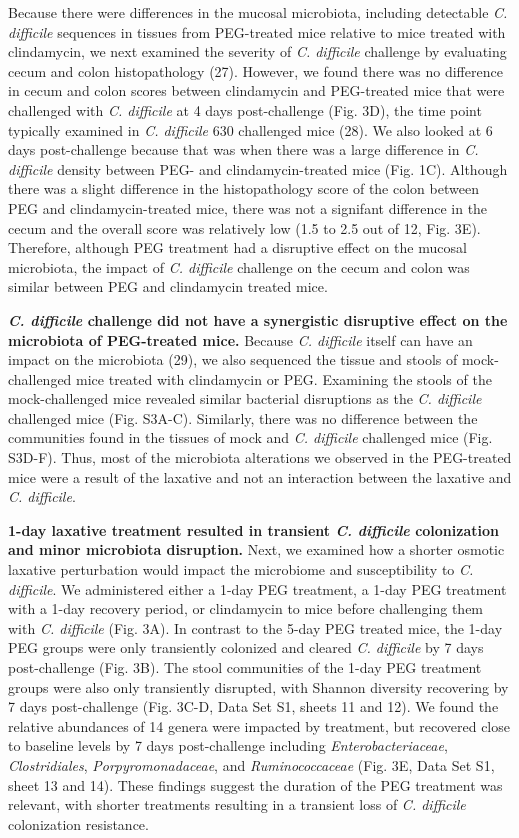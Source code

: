 \documentclass[
  11pt,
]{article}
\begin{document}
Because there were differences in the mucosal microbiota, including
detectable \emph{C. difficile} sequences in tissues from PEG-treated
mice relative to mice treated with clindamycin, we next examined the
severity of \emph{C. difficile} challenge by evaluating cecum and colon
histopathology (27). However, we found there was no difference in cecum
and colon scores between clindamycin and PEG-treated mice that were
challenged with \emph{C. difficile} at 4 days post-challenge (Fig. 3D),
the time point typically examined in \emph{C. difficile} 630 challenged
mice (28). We also looked at 6 days post-challenge because that was when
there was a large difference in \emph{C. difficile} density between PEG-
and clindamycin-treated mice (Fig. 1C). Although there was a slight
difference in the histopathology score of the colon between PEG and
clindamycin-treated mice, there was not a signifant difference in the
cecum and the overall score was relatively low (1.5 to 2.5 out of 12,
Fig. 3E). Therefore, although PEG treatment had a disruptive effect on
the mucosal microbiota, the impact of \emph{C. difficile} challenge on
the cecum and colon was similar between PEG and clindamycin treated
mice.

\textbf{\emph{C. difficile} challenge did not have a synergistic
disruptive effect on the microbiota of PEG-treated mice.} Because
\emph{C. difficile} itself can have an impact on the microbiota (29), we
also sequenced the tissue and stools of mock-challenged mice treated
with clindamycin or PEG. Examining the stools of the mock-challenged
mice revealed similar bacterial disruptions as the \emph{C. difficile}
challenged mice (Fig. S3A-C). Similarly, there was no difference between
the communities found in the tissues of mock and \emph{C. difficile}
challenged mice (Fig. S3D-F). Thus, most of the microbiota alterations
we observed in the PEG-treated mice were a result of the laxative and
not an interaction between the laxative and \emph{C. difficile}.

\textbf{1-day laxative treatment resulted in transient \emph{C.
difficile} colonization and minor microbiota disruption.} Next, we
examined how a shorter osmotic laxative perturbation would impact the
microbiome and susceptibility to \emph{C. difficile}. We administered
either a 1-day PEG treatment, a 1-day PEG treatment with a 1-day
recovery period, or clindamycin to mice before challenging them with
\emph{C. difficile} (Fig. 3A). In contrast to the 5-day PEG treated
mice, the 1-day PEG groups were only transiently colonized and cleared
\emph{C. difficile} by 7 days post-challenge (Fig. 3B). The stool
communities of the 1-day PEG treatment groups were also only transiently
disrupted, with Shannon diversity recovering by 7 days post-challenge
(Fig. 3C-D, Data Set S1, sheets 11 and 12). We found the relative
abundances of 14 genera were impacted by treatment, but recovered close
to baseline levels by 7 days post-challenge including
\emph{Enterobacteriaceae}, \emph{Clostridiales},
\emph{Porpyromonadaceae}, and \emph{Ruminococcaceae} (Fig. 3E, Data Set
S1, sheet 13 and 14). These findings suggest the duration of the PEG
treatment was relevant, with shorter treatments resulting in a transient
loss of \emph{C. difficile} colonization resistance.
\end{document}
